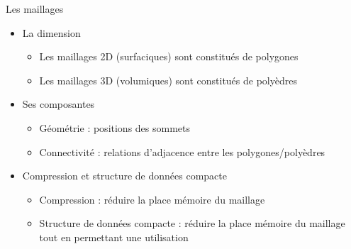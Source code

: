 \documentclass[9pt]{beamer}
\begin{document}
\begin{frame}
\begin{figure}[H]
\end{figure}
\small
\begin{block}{Les maillages}
\begin{itemize}
\item La dimension
\begin{itemize}
\item Les maillages 2D (surfaciques) sont constitués de polygones
\item Les maillages 3D (volumiques) sont constitués de polyèdres
\end{itemize}
\item Ses composantes
\begin{itemize}
\item Géométrie : positions des sommets
\item Connectivité : relations d’adjacence entre les polygones/polyèdres
\end{itemize}
\item Compression et structure de données compacte
\begin{itemize}
\item Compression : réduire la place mémoire du maillage
\item Structure de données compacte : réduire la place mémoire du maillage tout en permettant une utilisation
\end{itemize}
\end{itemize}
\end{block}
\end{frame}
\end{document}
